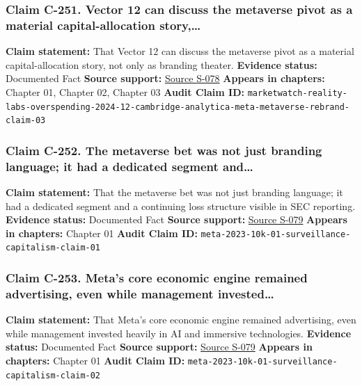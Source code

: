 \documentclass[
  american,
  11pt,
  letterpaper,
]{article}
\begin{document}
\subsubsection{Claim C-251. Vector 12 can discuss the metaverse pivot as
a material capital-allocation
story,\ldots{}}\label{claim-c-251-vector-12-can-discuss-the-metaverse-pivot-as-a-material-capital-allocation-story}

\textbf{Claim statement:} That Vector 12 can discuss the metaverse pivot
as a material capital-allocation story, not only as branding theater.
\textbf{Evidence status:} Documented Fact \textbf{Source support:}
\hyperref[source-s-078-with-reality-labs-meta-risks-heading-down-slippery-slope-of-overspending-again]{Source
S-078} \textbf{Appears in chapters:} Chapter 01, Chapter 02, Chapter 03
\textbf{Audit Claim ID:}
\texttt{marketwatch-reality-labs-overspending-2024-12-cambridge-analytica-meta-metaverse-rebrand-claim-03}

\subsubsection{Claim C-252. The metaverse bet was not just branding
language; it had a dedicated segment
and\ldots{}}\label{claim-c-252-the-metaverse-bet-was-not-just-branding-language-it-had-a-dedicated-segment-and}

\textbf{Claim statement:} That the metaverse bet was not just branding
language; it had a dedicated segment and a continuing loss structure
visible in SEC reporting. \textbf{Evidence status:} Documented Fact
\textbf{Source support:}
\hyperref[source-s-079-meta-platforms-inc-2023-annual-report-form-10-k]{Source
S-079} \textbf{Appears in chapters:} Chapter 01 \textbf{Audit Claim ID:}
\texttt{meta-2023-10k-01-surveillance-capitalism-claim-01}

\subsubsection{Claim C-253. Meta's core economic engine remained
advertising, even while management
invested\ldots{}}\label{claim-c-253-meta-s-core-economic-engine-remained-advertising-even-while-management-invested}

\textbf{Claim statement:} That Meta's core economic engine remained
advertising, even while management invested heavily in AI and immersive
technologies. \textbf{Evidence status:} Documented Fact \textbf{Source
support:}
\hyperref[source-s-079-meta-platforms-inc-2023-annual-report-form-10-k]{Source
S-079} \textbf{Appears in chapters:} Chapter 01 \textbf{Audit Claim ID:}
\texttt{meta-2023-10k-01-surveillance-capitalism-claim-02}
\end{document}
